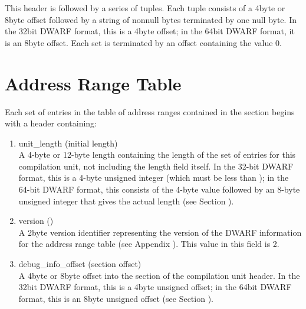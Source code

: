 This header is followed by a series of tuples. Each tuple
consists of a 4\dash byte or 8\dash byte offset followed by a string
of non\dash null bytes terminated by one null byte. 
In the 32\dash bit
DWARF format, this is a 4\dash byte offset; in the 64\dash bit DWARF
format, it is an 8\dash byte offset. 
Each set is terminated by an
offset containing the value 0.


\section{Address Range Table}
\label{datarep:addrssrangetable}

Each set of entries in the table of address ranges contained
in the 
section begins with a header containing:
\begin{enumerate}[1. ]

\item unit\_length (initial length) \\
A 4-byte or 12-byte length containing the length of the
set of entries for this compilation unit, not including the
length field itself. In the 32-bit DWARF format, this is a
4-byte unsigned integer (which must be less than \xfffffffzero);
in the 64-bit DWARF format, this consists of the 4-byte value
\wffffffff followed by an 8-byte unsigned integer that gives
the actual length 
(see Section ).

\item version () \\
A 2\dash byte version identifier representing the version of the
DWARF information for the address range table
(see Appendix ).
This value in this field  is 2. 
 

\item debug\_info\_offset (section offset) \\
A 
4\dash byte or 8\dash byte offset into the 
 section of
the compilation unit header. In the 32\dash bit DWARF format,
this is a 4\dash byte unsigned offset; in the 64\dash bit DWARF format,
this is an 8\dash byte unsigned offset 
(see Section ).


\end{enumerate}
